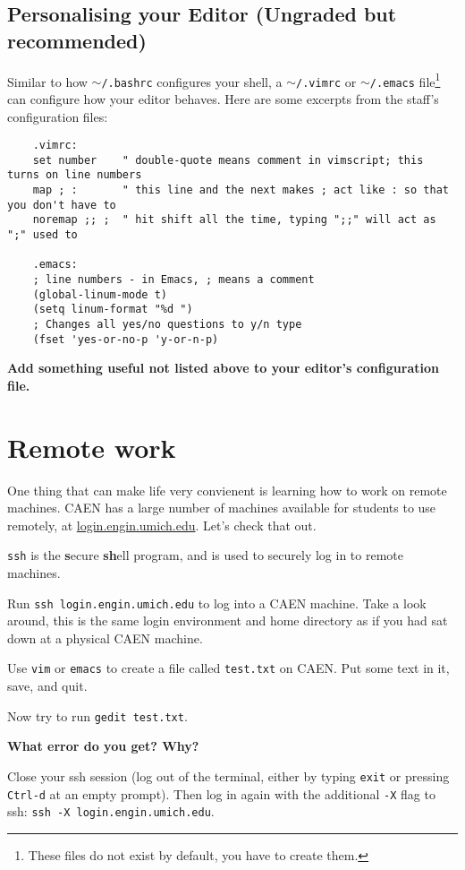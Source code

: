\documentclass{article}
\begin{document}
        \subsection*{Personalising your Editor (Ungraded but recommended)}
        Similar to how \texttt{$\sim$/.bashrc} configures your shell, a
    \texttt{$\sim$/.vimrc} or \texttt{$\sim$/.emacs} file\footnote{
      These files do not exist by default, you have to create them.
    } can configure how your editor behaves. Here are some excerpts from the
    staff's configuration files:
    \begin{lstlisting}
    .vimrc:
    set number    " double-quote means comment in vimscript; this turns on line numbers
    map ; :       " this line and the next makes ; act like : so that you don't have to
    noremap ;; ;  " hit shift all the time, typing ";;" will act as ";" used to

    .emacs:
    ; line numbers - in Emacs, ; means a comment
    (global-linum-mode t)
    (setq linum-format "%d ")
    ; Changes all yes/no questions to y/n type
    (fset 'yes-or-no-p 'y-or-n-p)
    \end{lstlisting}
    \textbf{Add something useful not listed above to your editor's configuration file.\\}


\newpage
\section{Remote work}
One thing that can make life very convienent is learning how to work on remote
machines. CAEN has a large number of machines available for students to use
remotely, at \url{login.engin.umich.edu}. Let's check that out.

\texttt{ssh} is the \textbf{s}ecure \textbf{sh}ell program, and is used to
securely log in to remote machines.

Run \texttt{ssh login.engin.umich.edu} to log into a CAEN machine. Take a look
around, this is the same login environment and home directory as if you had
sat down at a physical CAEN machine.

Use \texttt{vim} or \texttt{emacs} to create a file called \texttt{test.txt}
on CAEN. Put some text in it, save, and quit.

Now try to run \texttt{gedit~test.txt}.

\textbf{What error do you get? Why?}
\vspace{6em}

Close your ssh session (log out of the terminal, either by typing
\texttt{exit} or pressing \texttt{Ctrl-d} at an empty prompt). Then log in
again with the additional \texttt{-X} flag to ssh:
\texttt{ssh~-X~login.engin.umich.edu}.
\end{document}
